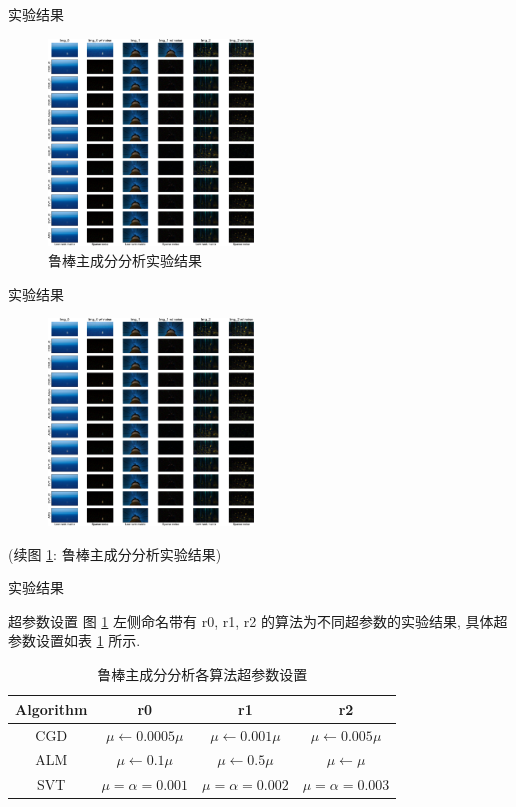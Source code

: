 \documentclass{beamer}
\begin{document}
\begin{frame}{实验结果}
  \begin{figure}[!htbp]
    \centering
    \includegraphics[height=5.5cm]{robust_pca_top.pdf}
    \caption{鲁棒主成分分析实验结果}
    \label{fig:results_rpca}
  \end{figure}
\end{frame}

\begin{frame}{实验结果}
  \begin{figure}[!htbp]
    \centering
    \includegraphics[height=5.5cm]{robust_pca_bottom.pdf}
  \end{figure}
  \centerline{(续图 \ref{fig:results_rpca}: 鲁棒主成分分析实验结果)}
\end{frame}

\begin{frame}{实验结果}
  \begin{block}{超参数设置}
    图 \ref{fig:results_rpca} 左侧命名带有 \textsf{r0}, \textsf{r1}, \textsf{r2} 的算法为不同超参数的实验结果, 具体超参数设置如表 \ref{tab:rpca_hyperparams} 所示.
  \end{block}
  \begin{table}[H]
    \centering
    \small
    \caption{鲁棒主成分分析各算法超参数设置}
    \label{tab:rpca_hyperparams}
    \begin{tabular}{cccc}
      \toprule
      Algorithm  & \textsf{r0}  & \textsf{r1} & \textsf{r2}  \\
      \midrule
      CGD & $\mu\leftarrow0.0005\mu$ & $\mu\leftarrow0.001\mu$ & $\mu\leftarrow0.005\mu$ \\
      ALM & $\mu\leftarrow0.1\mu$ & $\mu\leftarrow0.5\mu$ & $\mu\leftarrow\mu$ \\
      SVT & $\mu=\alpha=0.001$ & $\mu=\alpha=0.002$ & $\mu=\alpha=0.003$ \\
      \bottomrule
    \end{tabular}
  \end{table}
\end{frame}
\end{document}

